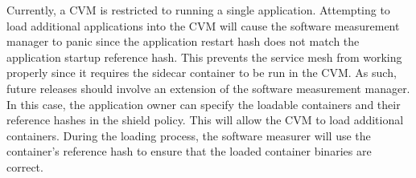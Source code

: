 Currently, a \acrshort{CVM} is restricted to running a single application. Attempting to load additional applications into the \acrshort{CVM}  will cause the software measurement manager to panic since the application restart hash does not match the application startup reference hash. 
This prevents the service mesh from working properly since it requires the sidecar container to be run in the \acrshort{CVM}. As such,  future releases should involve an extension of the software measurement manager. In this case, the application owner can specify the loadable containers and their 
reference hashes in the shield policy. This will allow the \acrshort{CVM} to load additional containers. During the loading process, the software measurer will use the container's reference hash to ensure that the loaded container binaries are correct.










